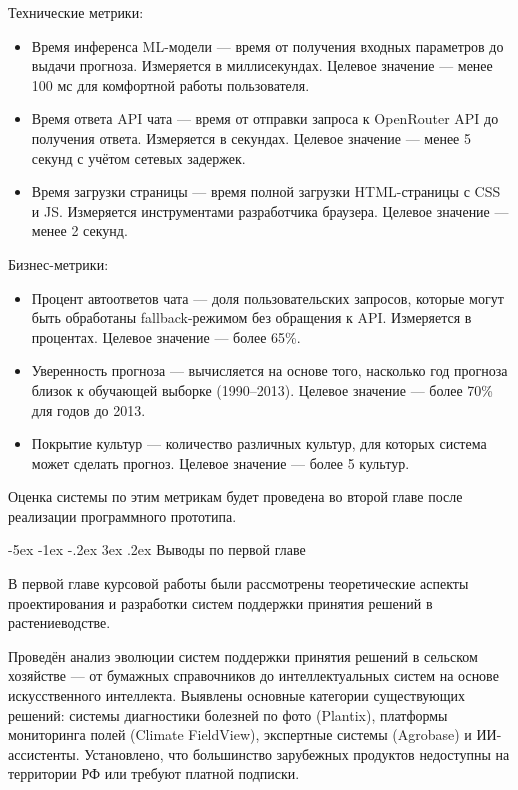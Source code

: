 \documentclass[14pt, a4paper]{extarticle}
\makeatletter
\renewcommand\subsection{\@startsection {subsection}{2}{\z@}%
    {-5ex \@plus -1ex \@minus -.2ex}%
    {3ex \@plus.2ex}%
    {\centering\large\bfseries}}
\makeatother
\begin{document}
    Технические метрики:

    \begin{itemize}
        \item Время инференса ML-модели — время от получения входных параметров до выдачи прогноза. Измеряется в миллисекундах. Целевое значение — менее 100 мс для комфортной работы пользователя.
        \item Время ответа API чата — время от отправки запроса к OpenRouter API до получения ответа. Измеряется в секундах. Целевое значение — менее 5 секунд с учётом сетевых задержек.
        \item Время загрузки страницы — время полной загрузки HTML-страницы с CSS и JS. Измеряется инструментами разработчика браузера. Целевое значение — менее 2 секунд.
    \end{itemize}

    Бизнес-метрики:

    \begin{itemize}
        \item Процент автоответов чата — доля пользовательских запросов, которые могут быть обработаны fallback-режимом без обращения к API. Измеряется в процентах. Целевое значение — более 65\%.
        \item Уверенность прогноза — вычисляется на основе того, насколько год прогноза близок к обучающей выборке (1990–2013). Целевое значение — более 70\% для годов до 2013.
        \item Покрытие культур — количество различных культур, для которых система может сделать прогноз. Целевое значение — более 5 культур.
    \end{itemize}

    Оценка системы по этим метрикам будет проведена во второй главе после реализации программного прототипа.

\subsection{Выводы по первой главе}

    В первой главе курсовой работы были рассмотрены теоретические аспекты проектирования и разработки систем поддержки принятия решений в растениеводстве.

    Проведён анализ эволюции систем поддержки принятия решений в сельском хозяйстве — от бумажных справочников до интеллектуальных систем на основе искусственного интеллекта. Выявлены основные категории существующих решений: системы диагностики болезней по фото (Plantix), платформы мониторинга полей (Climate FieldView), экспертные системы (Agrobase) и ИИ-ассистенты. Установлено, что большинство зарубежных продуктов недоступны на территории РФ или требуют платной подписки.
\end{document}
